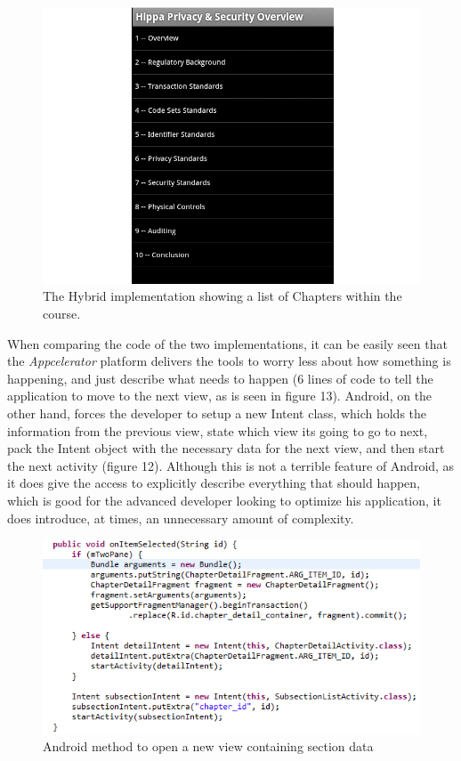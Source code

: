 \documentclass[11pt, twocolumn]{article}
\begin{document}
\begin{figure}[h!]
\includegraphics[scale=0.4]{appcelerator-chapter-implementation}
\caption{The Hybrid implementation showing a list of Chapters within the course.}
\end{figure}

When comparing the code of the two implementations, it can be easily seen that the {\it Appcelerator} platform delivers the tools to worry less about how something is happening, and just describe what needs to happen (6 lines of code to tell the application to move to the next view, as is seen in figure 13).  Android, on the other hand, forces the developer to setup a new Intent class, which holds the information from the previous view, state which view its going to go to next, pack the Intent object with the necessary data for the next view, and then start the next activity (figure 12).  Although this is not a terrible feature of Android, as it does give the access to explicitly describe everything that should happen, which is good for the advanced developer looking to optimize his application, it does introduce, at times, an unnecessary amount of complexity.\\

\begin{figure}[h]
\includegraphics[scale=0.6]{android-code}
\caption{Android method to open a new view containing section data ~\cite{Poulsen2012}}
\end{figure}
\end{document}
